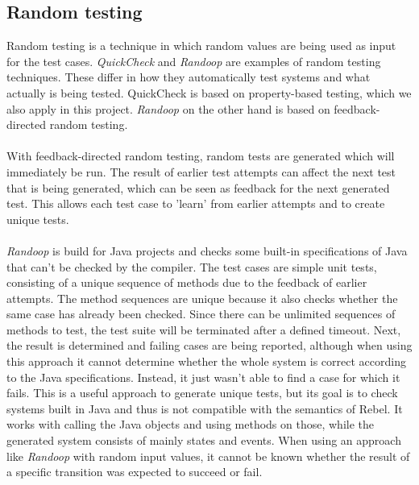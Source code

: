 \subsection{Random testing}
Random testing is a technique in which random values are being used as input for the test cases. \textit{QuickCheck} \cite{claessen2011quickcheck} and \textit{Randoop} \cite{pacheco2007randoop} are examples of random testing techniques. These differ in how they automatically test systems and what actually is being tested. QuickCheck is based on property-based testing, which we also apply in this project. \textit{Randoop} on the other hand is based on feedback-directed random testing.\\
\\
With feedback-directed random testing, random tests are generated which will immediately be run. The result of earlier test attempts can affect the next test that is being generated, which can be seen as feedback for the next generated test. This allows each test case to 'learn' from earlier attempts and to create unique tests.\\
\\
\textit{Randoop} is build for Java projects and checks some built-in specifications of Java that can't be checked by the compiler. The test cases are simple unit tests, consisting of a unique sequence of methods due to the feedback of earlier attempts. The method sequences are unique because it also checks whether the same case has already been checked. Since there can be unlimited sequences of methods to test, the test suite will be terminated after a defined timeout. Next, the result is determined and failing cases are being reported, although when using this approach it cannot determine whether the whole system is correct according to the Java specifications. Instead, it just wasn't able to find a case for which it fails. This is a useful approach to generate unique tests, but its goal is to check systems built in Java and thus is not compatible with the semantics of Rebel. It works with calling the Java objects and using methods on those, while the generated system consists of mainly states and events. When using an approach like \textit{Randoop} with random input values, it cannot be known whether the result of a specific transition was expected to succeed or fail.



